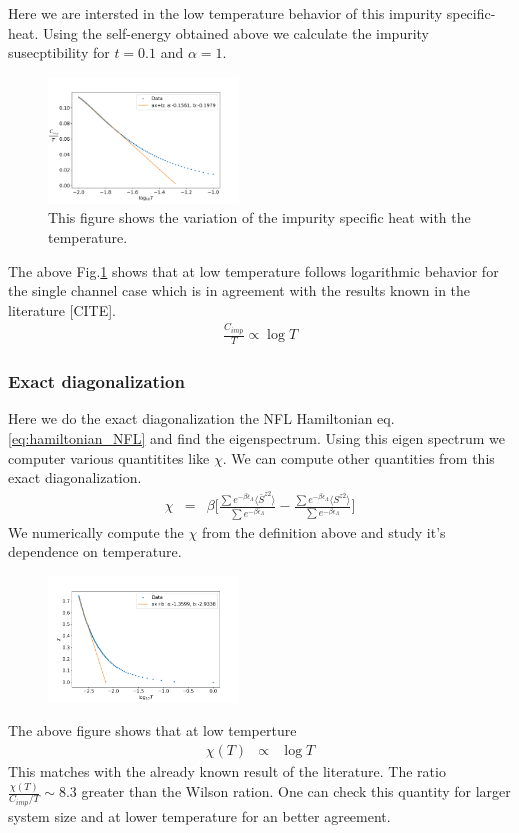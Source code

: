 \documentclass[reprint,prb,superscriptaddress]{revtex4-2}
\begin{document}
Here we are intersted in the low temperature behavior of this impurity specific-heat. Using the self-energy obtained above we calculate the impurity susecptibility for $t=0.1$ and $\alpha=1$. 
\begin{figure}
\centering
\includegraphics[width=0.45\textwidth]{plt/FINAL_fitted_Cv_t_0p1.png}
\caption{This figure shows the variation of the impurity specific heat with the temperature.}
\label{fig:Cv_imp}
\end{figure}
The above Fig.\ref{fig:Cv_imp} shows that at low temperature follows logarithmic behavior for the single channel case which is in agreement with the results known in the literature [CITE].
\begin{eqnarray}
\frac{C_{imp}}{T} \propto \log T
\end{eqnarray}


\subsubsection{Exact diagonalization}
Here we do the exact diagonalization the NFL Hamiltonian eq.\eqref{eq:hamiltonian_NFL} and find the eigenspectrum. Using this eigen spectrum  we computer various quantitites like $\chi$. We can compute other quantities from this exact diagonalization. 
\begin{eqnarray}
\chi &=& \beta\bigg[\frac{\sum e^{-\beta \bar{\epsilon}_{\Lambda}} \langle \bar{S}^{z2} \rangle}{\sum e^{-\beta \bar{\epsilon}_{\Lambda}} } -\frac{\sum e^{-\beta \epsilon_{\Lambda}} \langle S^{z2 }\rangle }{\sum e^{-\beta \epsilon_{\Lambda}} } \bigg] 
\end{eqnarray}
We numerically compute the $\chi$ from the definition above and study it's dependence on temperature.
\begin{figure}[!h]
\centering
\includegraphics[width=0.45\textwidth]{plt/NFL_Chi_log_0p1}
\end{figure}
The above figure shows that at low temperture
\begin{eqnarray}
\chi(T) &\propto& \log T
\end{eqnarray}
This matches with the already known result of the literature. The ratio $\frac{\chi(T)}{C_{imp}/T} \sim 8.3$ greater than the Wilson ration. One can check this quantity for larger system size and at lower temperature for an better agreement.
\end{document}

